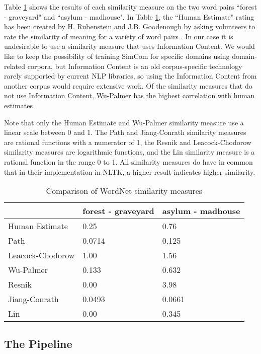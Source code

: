 \documentclass{article}
\begin{document}
Table \ref{table:wordnetsimilarity} shows the results of each similarity measure on the two word pairs ``forest - graveyard" and ``asylum - madhouse". In Table \ref{table:wordnetsimilarity}, the ``Human Estimate" rating has been created by H. Rubenstein and J.B. Goodenough by asking volunteers to rate the similarity of meaning for a variety of word pairs \cite{rubenstein1965contextual}. In our case it is undesirable to use a similarity measure that uses Information Content. We would like to keep the possibility of training SimCom for specific domains using domain-related corpora, but Information Content is an old corpus-specific technology rarely supported by current NLP libraries, so using the Information Content from another corpus would require extensive work. Of the similarity measures that do not use Information Content, Wu-Palmer has the highest correlation with human estimates \citep{budanitsky2006evaluating,seco2004intrinsic,mihalcea2006corpus}.

Note that only the Human Estimate and Wu-Palmer similarity measure use a linear scale between 0 and 1. The Path and Jiang-Conrath similarity measures are rational functions with a numerator of 1, the Resnik and Leacock-Chodorow similarity measures are logarithmic functions, and the Lin similarity measure is a rational function in the range 0 to 1. All similarity measures do have in common that in their implementation in NLTK, a higher result indicates higher similarity.

\begin{table}[h!]
\caption{Comparison of WordNet similarity measures} %
\centering
\begin{tabular}{lll}
	\toprule
	& forest - graveyard & asylum - madhouse \\
	\midrule
	Human Estimate & 0.25 & 0.76 \\
	Path & 0.0714 & 0.125 \\
	Leacock-Chodorow & 1.00 & 1.56 \\
	Wu-Palmer & 0.133 & 0.632 \\
	Resnik & 0.00 & 3.98 \\
	Jiang-Conrath & 0.0493 & 0.0661 \\
	Lin & 0.00 & 0.345 \\
	\bottomrule
\end{tabular}
\label{table:wordnetsimilarity}
\end{table}

\subsection{The Pipeline}
\end{document}
